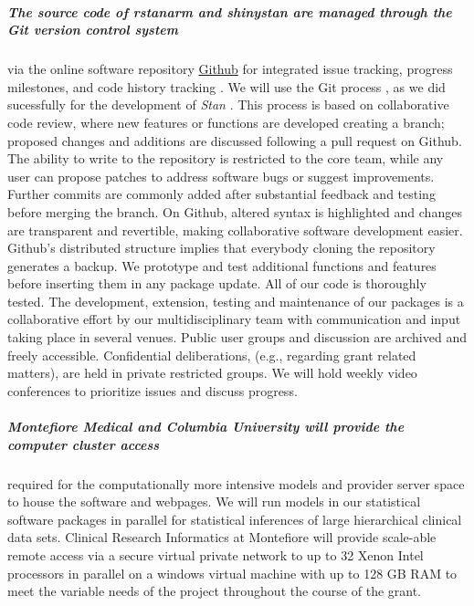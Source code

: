 \documentclass[11pt,notitlepage]{article}
\begin{document}
\subparagraph*{The source code of \textit{rstanarm} and \textit{shinystan} are managed through the Git version control system}
\cite{Chacon2009ProGit} via the online software repository \href{https://github.com/}{Github} for integrated issue tracking, 
progress milestones, and code history tracking \cite{loeliger2012version}. We will use the Git process \cite{Driessen2010successful}, 
as we did sucessfully for the development of \textit{Stan} \cite{Stan-manual:2015}. This  process is based on collaborative code review, 
where new features or functions are developed creating a branch; proposed changes and additions are discussed following a pull request on 
Github. The ability to write to the repository is restricted to the core team, while any user can propose patches to address software 
bugs or suggest improvements. Further commits are commonly added after substantial feedback and testing before merging the branch.  
On Github, altered syntax is highlighted and changes are transparent and revertible, making collaborative software development easier. 
Github's distributed structure implies that everybody cloning the repository generates a backup. We prototype and test additional 
functions and features before inserting them in any package update. All of our code is thoroughly tested.
The development, extension, testing and maintenance of our packages is a collaborative effort by our multidisciplinary team with 
communication and input taking place in several venues. Public user groups and discussion are archived and freely accessible. 
Confidential deliberations, (e.g., regarding grant related matters), are held in private restricted groups. We will hold weekly video 
conferences to prioritize issues and discuss progress.

\subparagraph{Montefiore Medical and Columbia University will provide the computer cluster access} required for the computationally more intensive 
models and provider server space to house the software and webpages. We will run models in our statistical software packages in parallel 
for statistical inferences of large hierarchical clinical data sets. Clinical Research Informatics at Montefiore will provide scale-able 
remote access via a secure virtual private network to up to 32 Xenon Intel processors in parallel on a windows virtual machine with up to 
128 GB RAM to meet the variable needs of the project throughout the course of the grant. 
\end{document}
